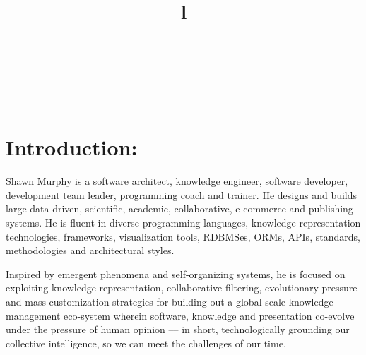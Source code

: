 \documentclass[line,margin]{res}
\begin{document}
 \address{\url{http://smurp.com}\\ Edmonton \& Saltspring\\ 
 \href{callto:+17809032428}{(780) 903-2428}\\
  {\tt \href{mailto:smurp@smurp.com}{smurp@smurp.com}}}

\resumewidth=7in
\textheight=10.2in
\begin{resume}

\begin{format}
\title{l}\\
\\
\body\\
\end{format}


\section{Introduction:}
\begin{par}

Shawn Murphy is a software architect, knowledge engineer,
software developer, development team leader, programming coach
and trainer.
He designs and builds large data-driven, scientific, academic, 
collaborative, e-commerce and publishing systems. 
He is fluent in diverse programming languages, knowledge
representation technologies, frameworks, visualization tools, RDBMSes,
ORMs, APIs, standards, methodologies and architectural styles. 

\begin{comment}
Examples of his work include:  
  a vehicle fleet tracking system with RESTful API;
  multiple dynamic knowledge visualization systems;
  a custom database publishing system used by the largest real estate
    markets in Western Canada;
  real-estate systems powered by his own RETS implementation; 
  a large bibliographic collaboration system seeded with Library of Congress data; 
  a Laboratory Information Management System for disease diagnosis which 
    captured, processed and reported on disparate scientific data streams; 
  recruiting management systems;
  numerous B2B and B2C e-commerce technologies and systems 
    (handling both digital and tangible goods);
  and many other projects involving sophisticated data-sets and processing. 
\end{comment}

Inspired by emergent phenomena and self-organizing systems, he is focused 
on exploiting knowledge representation, collaborative filtering, evolutionary
pressure and mass customization strategies for building out a global-scale
knowledge management eco-system wherein software, knowledge and presentation
co-evolve under the pressure of human opinion --– in short, technologically 
grounding our collective intelligence, so we can meet the challenges of our 
time.


\end{par}
\end{resume}
\end{document}
